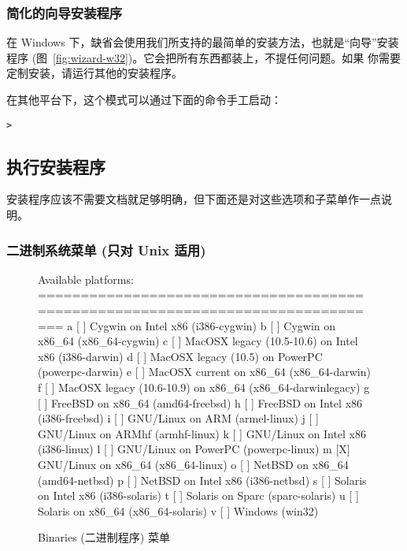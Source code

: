 \documentclass{article}
\begin{document}
\subsubsection{简化的向导安装程序}

在 Windows 下，缺省会使用我们所支持的最简单的安装方法，也就是“向导”安装
程序 (图~\ref{fig:wizard-w32})。它会把所有东西都装上，不提任何问题。如果
你需要定制安装，请运行其他的安装程序。

在其他平台下，这个模式可以通过下面的命令手工启动：
\begin{alltt}
> 
\end{alltt}


\subsection{执行安装程序}
\label{sec:runinstall}

安装程序应该不需要文档就足够明确，但下面还是对这些选项和子菜单作一点说明。

\subsubsection{二进制系统菜单 (只对 Unix 适用)}
\label{sec:binary}

\begin{figure}[tb]
\begin{boxedverbatim}
Available platforms:
===============================================================================
   a [ ] Cygwin on Intel x86 (i386-cygwin)
   b [ ] Cygwin on x86_64 (x86_64-cygwin)
   c [ ] MacOSX legacy (10.5-10.6) on Intel x86 (i386-darwin)
   d [ ] MacOSX legacy (10.5) on PowerPC (powerpc-darwin)
   e [ ] MacOSX current on x86_64 (x86_64-darwin)
   f [ ] MacOSX legacy (10.6-10.9) on x86_64 (x86_64-darwinlegacy)
   g [ ] FreeBSD on x86_64 (amd64-freebsd)
   h [ ] FreeBSD on Intel x86 (i386-freebsd)
   i [ ] GNU/Linux on ARM (armel-linux)
   j [ ] GNU/Linux on ARMhf (armhf-linux)
   k [ ] GNU/Linux on Intel x86 (i386-linux)
   l [ ] GNU/Linux on PowerPC (powerpc-linux)
   m [X] GNU/Linux on x86_64 (x86_64-linux)
   o [ ] NetBSD on x86_64 (amd64-netbsd)
   p [ ] NetBSD on Intel x86 (i386-netbsd)
   s [ ] Solaris on Intel x86 (i386-solaris)
   t [ ] Solaris on Sparc (sparc-solaris)
   u [ ] Solaris on x86_64 (x86_64-solaris)
   v [ ] Windows (win32)
\end{boxedverbatim}
\caption{Binaries (二进制程序) 菜单}\label{fig:bin-text}
\end{figure}
\end{document}
